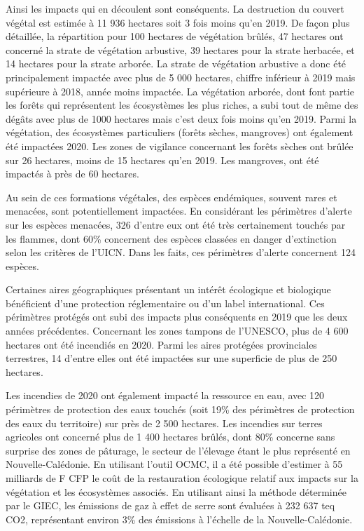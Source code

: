 \documentclass[
  11pt,
  letterpaper,
]{scrreprt}
\begin{document}
Ainsi les impacts qui en découlent sont conséquents. La destruction du
couvert végétal est estimée à 11 936 hectares soit 3 fois moins qu'en
2019. De façon plus détaillée, la répartition pour 100 hectares de
végétation brûlés, 47 hectares ont concerné la strate de végétation
arbustive, 39 hectares pour la strate herbacée, et 14 hectares pour la
strate arborée. La strate de végétation arbustive a donc été
principalement impactée avec plus de 5 000 hectares, chiffre inférieur à
2019 mais supérieure à 2018, année moins impactée. La végétation
arborée, dont font partie les forêts qui représentent les écosystèmes
les plus riches, a subi tout de même des dégâts avec plus de 1000
hectares mais c'est deux fois moins qu'en 2019. Parmi la végétation, des
écosystèmes particuliers (forêts sèches, mangroves) ont également été
impactées 2020. Les zones de vigilance concernant les forêts sèches ont
brûlée sur 26 hectares, moins de 15 hectares qu'en 2019. Les mangroves,
ont été impactés à près de 60 hectares.

Au sein de ces formations végétales, des espèces endémiques, souvent
rares et menacées, sont potentiellement impactées. En considérant les
périmètres d'alerte sur les espèces menacées, 326 d'entre eux ont été
très certainement touchés par les flammes, dont 60\% concernent des
espèces classées en danger d'extinction selon les critères de l'UICN.
Dans les faits, ces périmètres d'alerte concernent 124 espèces.

Certaines aires géographiques présentant un intérêt écologique et
biologique bénéficient d'une protection réglementaire ou d'un label
international. Ces périmètres protégés ont subi des impacts plus
conséquents en 2019 que les deux années précédentes. Concernant les
zones tampons de l'UNESCO, plus de 4 600 hectares ont été incendiés en
2020. Parmi les aires protégées provinciales terrestres, 14 d'entre
elles ont été impactées sur une superficie de plus de 250 hectares.

Les incendies de 2020 ont également impacté la ressource en eau, avec
120 périmètres de protection des eaux touchés (soit 19\% des périmètres
de protection des eaux du territoire) sur près de 2 500 hectares. Les
incendies sur terres agricoles ont concerné plus de 1 400 hectares
brûlés, dont 80\% concerne sans surprise des zones de pâturage, le
secteur de l'élevage étant le plus représenté en Nouvelle-Calédonie. En
utilisant l'outil OCMC, il a été possible d'estimer à 55 milliards de F
CFP le coût de la restauration écologique relatif aux impacts sur la
végétation et les écosystèmes associés. En utilisant ainsi la méthode
déterminée par le GIEC, les émissions de gaz à effet de serre sont
évaluées à 232 637 teq CO2, représentant environ 3\% des émissions à
l'échelle de la Nouvelle-Calédonie.
\end{document}
